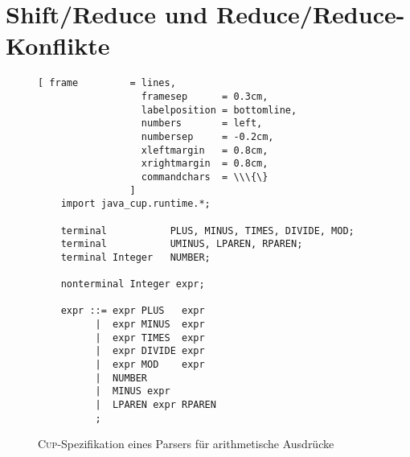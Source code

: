 \section{Shift/Reduce und Reduce/Reduce-Konflikte}
\begin{figure}[!ht]
\centering
\begin{Verbatim}[ frame         = lines, 
                  framesep      = 0.3cm, 
                  labelposition = bottomline,
                  numbers       = left,
                  numbersep     = -0.2cm,
                  xleftmargin   = 0.8cm,
                  xrightmargin  = 0.8cm,
                  commandchars  = \\\{\}
                ]
    import java_cup.runtime.*;
    
    terminal           PLUS, MINUS, TIMES, DIVIDE, MOD;
    terminal           UMINUS, LPAREN, RPAREN;
    terminal Integer   NUMBER;
    
    nonterminal Integer expr;
    
    expr ::= expr PLUS   expr
          |  expr MINUS  expr
          |  expr TIMES  expr
          |  expr DIVIDE expr
          |  expr MOD    expr
          |  NUMBER               
          |  MINUS expr
          |  LPAREN expr RPAREN   
          ;
\end{Verbatim}
\vspace*{-0.3cm}
\caption{\textsc{Cup}-Spezifikation eines Parsers f\"ur arithmetische Ausdr\"ucke}
\label{fig:calc-ambiguous.cup}
\end{figure}

